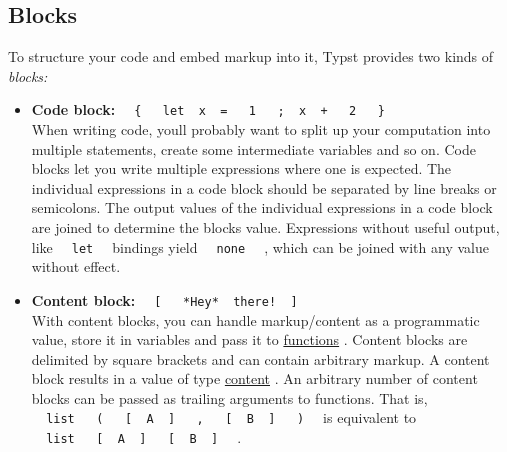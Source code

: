 \subsection{Blocks}\label{blocks}

To structure your code and embed markup into it, Typst provides two
kinds of \emph{blocks:}

\begin{itemize}
\item
  \textbf{Code block:}
  \texttt{\ }{\texttt{\ \{\ }}\texttt{\ }{\texttt{\ let\ }}\texttt{\ x\ }{\texttt{\ =\ }}\texttt{\ }{\texttt{\ 1\ }}\texttt{\ }{\texttt{\ ;\ }}\texttt{\ x\ }{\texttt{\ +\ }}\texttt{\ }{\texttt{\ 2\ }}\texttt{\ }{\texttt{\ \}\ }}\texttt{\ }\\
  When writing code, you\textquotesingle ll probably want to split up
  your computation into multiple statements, create some intermediate
  variables and so on. Code blocks let you write multiple expressions
  where one is expected. The individual expressions in a code block
  should be separated by line breaks or semicolons. The output values of
  the individual expressions in a code block are joined to determine the
  block\textquotesingle s value. Expressions without useful output, like
  \texttt{\ }{\texttt{\ let\ }}\texttt{\ } bindings yield
  \texttt{\ }{\texttt{\ none\ }}\texttt{\ } , which can be joined with
  any value without effect.
\item
  \textbf{Content block:}
  \texttt{\ }{\texttt{\ {[}\ }}\texttt{\ }{\texttt{\ *Hey*\ }}\texttt{\ there!\ }{\texttt{\ {]}\ }}\texttt{\ }\\
  With content blocks, you can handle markup/content as a programmatic
  value, store it in variables and pass it to
  \href{/docs/reference/foundations/function/}{functions} . Content
  blocks are delimited by square brackets and can contain arbitrary
  markup. A content block results in a value of type
  \href{/docs/reference/foundations/content/}{content} . An arbitrary
  number of content blocks can be passed as trailing arguments to
  functions. That is,
  \texttt{\ }{\texttt{\ list\ }}\texttt{\ }{\texttt{\ (\ }}\texttt{\ }{\texttt{\ {[}\ }}\texttt{\ A\ }{\texttt{\ {]}\ }}\texttt{\ }{\texttt{\ ,\ }}\texttt{\ }{\texttt{\ {[}\ }}\texttt{\ B\ }{\texttt{\ {]}\ }}\texttt{\ }{\texttt{\ )\ }}\texttt{\ }
  is equivalent to
  \texttt{\ }{\texttt{\ list\ }}\texttt{\ }{\texttt{\ {[}\ }}\texttt{\ A\ }{\texttt{\ {]}\ }}\texttt{\ }{\texttt{\ {[}\ }}\texttt{\ B\ }{\texttt{\ {]}\ }}\texttt{\ }
  .
\end{itemize}

